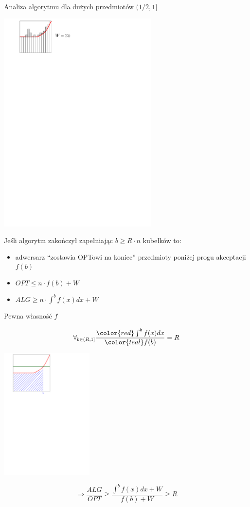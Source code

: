 \documentclass{beamer}
\begin{document}
\begin{frame}{Analiza algorytmu dla dużych przedmiotów $(1/2, 1]$}
  \begin{center}
    \includegraphics[width=0.6\textwidth]{figs/example2.pdf}
  \end{center}

  \vspace{-0.1cm}
  
  Jeśli algorytm zakończył zapełniając $b \geq R\cdot n$ kubełków to:
    \begin{itemize}
      \item adwersarz ``zostawia OPTowi na koniec'' przedmioty poniżej progu akceptacji $f(b)$
      \item $OPT \leq n\cdot f(b) + W$
      \item $ALG \geq n\cdot \int^{b}f(x) dx + W$
    \end{itemize}
\end{frame}

\begin{frame}{Pewna własność $f$}
  
  $$\forall_{b \in (R, 1]}\frac{{\color{red} \int^bf(x)dx}}{{\color{teal} f(b)}} = R$$
  
  \begin{center}\includegraphics[width=0.35\textwidth]{figs/f_properties}\end{center}

  $$ \Rightarrow \frac{ALG}{OPT} \geq \frac{\int^bf(x)dx + W}{f(b) + W} \geq R $$
\end{frame}
\end{document}
